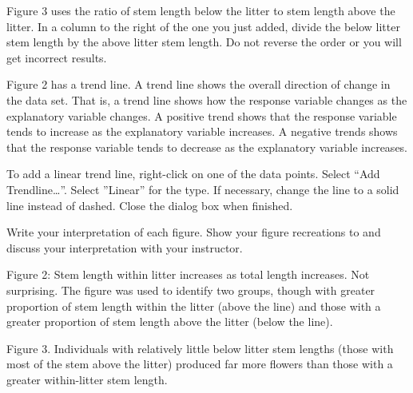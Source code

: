 \documentclass[12pt, hidelinks]{exam}
\newenvironment{AnswerPage}[1]
    {\begin{minipage}[t][#1]{0.92\textwidth}%
    \begin{solution}}
    {\end{solution}\end{minipage}
    \vspace{\stretch{1}}}
\newlength{\basespace}
\begin{document}
\begin{questions}
Figure 3 uses the ratio of stem length below the litter to stem length above the litter. In a column to the right of the one you just added, divide the below litter stem length by the above litter stem length. Do not reverse the order or you will get incorrect results.


Figure 2 has a trend line. A trend line shows the overall direction of change in the data set. That is, a trend line shows how the response variable changes as the explanatory variable changes. A positive trend shows that the response variable tends to increase as the explanatory variable increases. A negative trends shows that the response variable tends to decrease as the explanatory variable increases.

To add a linear trend line, right-click on one of the data points. Select “Add Trendline\dots”. Select ”Linear” for the type. If necessary, change the line to a solid line instead of dashed. Close the dialog box when finished.

\question[Checkout]
Write your interpretation of each figure. Show your figure recreations to and discuss your interpretation with your instructor.

\begin{AnswerPage}{2\basespace}
	Figure 2: Stem length within litter increases as total length increases. Not surprising. The figure was used to identify two groups, though with greater proportion of stem length within the litter (above the line) and those with a greater proportion of stem length above the litter (below the line).\bigskip
	
	Figure 3. Individuals with relatively little below litter stem lengths (those with most of the stem above the litter) produced far more flowers than those with a greater within-litter stem length.
\end{AnswerPage}


\end{questions}
\end{document}
